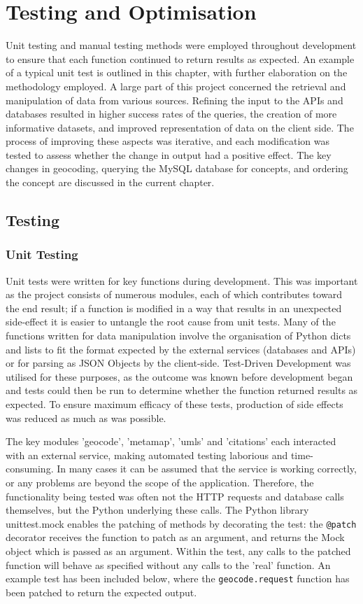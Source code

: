 \documentclass[Report.tex]{subfiles}
\begin{document}
\chapter{Testing and Optimisation}
Unit testing and manual testing methods were employed throughout development to ensure that each function continued to return results as expected. An example of a typical unit test is outlined in this chapter, with further elaboration on the methodology employed. A large part of this project concerned the retrieval and manipulation of data from various sources. Refining the input to the APIs and databases resulted in higher success rates of the queries, the creation of more informative datasets, and improved representation of data on the client side. The process of improving these aspects was iterative, and each modification was tested to assess whether the change in output had a positive effect. The key changes in geocoding, querying the MySQL database for concepts, and ordering the concept are discussed in the current chapter.

\section{Testing}
\subsection{Unit Testing}
Unit tests were written for key functions during development. This was important as the project consists of numerous modules, each of which contributes toward the end result; if a function is modified in a way that results in an unexpected side-effect it is easier to untangle the root cause from unit tests. Many of the functions written for data manipulation involve the organisation of Python dicts and lists to fit the format expected by the external services (databases and APIs) or for parsing as JSON Objects by the client-side. Test-Driven Development was utilised for these purposes, as the outcome was known before development began and tests could then be run to determine whether the function returned results as expected. To ensure maximum efficacy of these tests, production of side effects was reduced as much as was possible. \newline

\noindent The key modules 'geocode', 'metamap', 'umls' and 'citations' each interacted with an external service, making automated testing laborious and time-consuming. In many cases it can be assumed that the service is working correctly, or any problems are beyond the scope of the application. Therefore, the functionality being tested was often not the HTTP requests and database calls themselves, but the Python underlying these calls. The Python library unittest.mock enables the patching of methods by decorating the test: the \texttt{@patch} decorator receives the function to patch as an argument, and returns the Mock object which is passed as an argument. Within the test, any calls to the patched function will behave as specified without any calls to the 'real' function. An example test has been included below, where the \texttt{geocode.request} function has been patched to return the expected output.\newline
\end{document}
